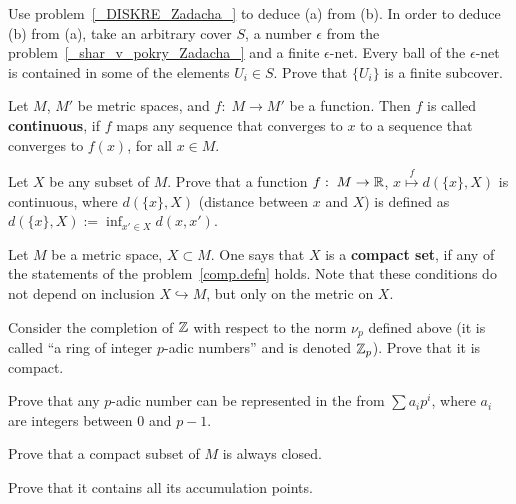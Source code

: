 \documentclass[12pt]{article}
\begin{document}
\begin{ukazanie} Use problem~\ref{_DISKRE_Zadacha_} to deduce (a) from
  (b).  In order to deduce (b) from (a), take an arbitrary cover $S$,
  a number $\epsilon$ from the problem~\ref{_shar_v_pokry_Zadacha_}
  and a finite $\epsilon$-net. Every ball of the $\epsilon$-net is
  contained in some of the elements $U_i\in S$. Prove that $\{U_i\}$
  is a finite subcover.
\end{ukazanie}

\begin{opredelenie} Let $M$, $M'$ be metric spaces, and $f:\; M \to
  M'$ be a function. Then $f$ is called {\bf continuous}, if $f$
  maps any sequence that converges to $x$ to a sequence that converges to
  $f(x)$, for all $x\in M$.
\end{opredelenie}

\begin{zadacha}[!] Let $X$ be any subset of $M$.  Prove that a function
  $f:\; M \to {\mathbb R}$, $x \overset f \mapsto d(\{x\}, X)$ is continuous,
  where $d(\{x\}, X)$ (distance between $x$ and $X$) is defined as
  $d(\{x\}, X):=\inf_{x'\in X}d(x, x')$.
\end{zadacha}

\begin{opredelenie} Let $M$ be a metric space, $X\subset M$.
  One says that $X$ is a {\bf compact set},
  if any of the statements of the problem~\ref{comp.defn} holds. Note
  that these conditions do not depend on inclusion $X\hookrightarrow
  M$, but only on the metric on $X$.
\end{opredelenie}

\begin{zadacha}[!] Consider the completion of ${\mathbb Z}$ with respect to the norm
  $\nu_p$ defined above (it is called ``a ring of integer $p$-adic
  numbers'' and is denoted ${\mathbb Z}_p$). Prove that it is compact.
\end{zadacha}

\begin{ukazanie} Prove that any $p$-adic number can be represented in
  the from $\sum a_i p^i$, where $a_i$ are integers between 0
  and $p-1$.
\end{ukazanie}

\begin{zadacha} Prove that a compact subset of $M$ is always closed. 
\end{zadacha}

\begin{ukazanie} Prove that it contains all its accumulation points.
\end{ukazanie}
\end{document}
